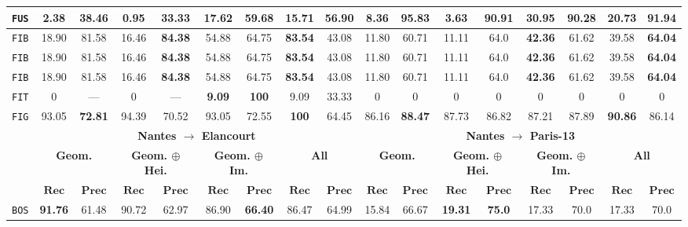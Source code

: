 \begin{sidewaystable}[htbp]
\begin{tabular}{|c | c c | c c | c c | c c || c c | c c | c c | c c |}
                \hline
                \texttt{FUS} & 2.38 & 38.46 & 0.95 & 33.33 & \textbf{17.62} & \textbf{59.68} & 15.71 & 56.90 & 8.36 & \textbf{95.83} & 3.63 & 90.91 & \textbf{30.95} & 90.28 & 20.73 & 91.94 \\
                \hline
                \texttt{FIB} & 18.90 & 81.58 & 16.46 & \textbf{84.38} & 54.88 & 64.75 & \textbf{83.54} & 43.08 & 11.80 & 60.71 & 11.11 & 64.0 & \textbf{42.36} & 61.62 & 39.58 & \textbf{64.04} \\ 
                    \texttt{FIB} & 18.90 & 81.58 & 16.46 & \textbf{84.38} & 54.88 & 64.75 & \textbf{83.54} & 43.08 & 11.80 & 60.71 & 11.11 & 64.0 & \textbf{42.36} & 61.62 & 39.58 & \textbf{64.04} \\ 
                \texttt{FIB} & 18.90 & 81.58 & 16.46 & \textbf{84.38} & 54.88 & 64.75 & \textbf{83.54} & 43.08 & 11.80 & 60.71 & 11.11 & 64.0 & \textbf{42.36} & 61.62 & 39.58 & \textbf{64.04} \\ 
                \hline
                \texttt{FIT} & 0 & --- & 0 & --- & \textbf{9.09} & \textbf{100} & 9.09 & 33.33 & 0 & 0 & 0 & 0 & 0 & 0 & 0 & 0 \\
                \hline
                \texttt{FIG} & 93.05 & \textbf{72.81} & 94.39 & 70.52 & 93.05 & 72.55 & \textbf{100} & 64.45 & 86.16 & \textbf{88.47} & 87.73 & 86.82 & 87.21 & 87.89 & \textbf{90.86} & 86.14 \\
                \hline
                \hline
                & \multicolumn{8}{c||}{\textbf{Nantes \(\rightarrow\) Elancourt}} & \multicolumn{8}{c|}{\textbf{Nantes \(\rightarrow\) Paris-13}}\\
                \hline
                &\multicolumn{2}{c|}{\textbf{Geom.}} & \multicolumn{2}{c|}{\textbf{Geom. \(\oplus\) Hei.}} & \multicolumn{2}{c|}{\textbf{Geom. \(\oplus\) Im.}} & \multicolumn{2}{c||}{\textbf{All}} & \multicolumn{2}{c|}{\textbf{Geom.}} & \multicolumn{2}{c|}{\textbf{Geom. \(\oplus\) Hei.}} & \multicolumn{2}{c|}{\textbf{Geom. \(\oplus\) Im.}} & \multicolumn{2}{x{1.5cm}|}{\textbf{All}}\\
                \cline{2-17}
                & \(\bm{Rec}\) & \(\bm{Prec}\) &  \(\bm{Rec}\) & \(\bm{Prec}\) &  \(\bm{Rec}\) & \(\bm{Prec}\) &  \(\bm{Rec}\) & \(\bm{Prec}\) & \(\bm{Rec}\) & \(\bm{Prec}\) &  \(\bm{Rec}\) & \(\bm{Prec}\) &  \(\bm{Rec}\) & \(\bm{Prec}\) &  \(\bm{Rec}\) & \(\bm{Prec}\) \\
                \hline
                \texttt{BOS} & \textbf{91.76} & 61.48 & 90.72 & 62.97 & 86.90 & \textbf{66.40} & 86.47 & 64.99 & 15.84 & 66.67 & \textbf{19.31} & \textbf{75.0} & 17.33 & 70.0 & 17.33 & 70.0 \\

\end{tabular}
\end{sidewaystable}
